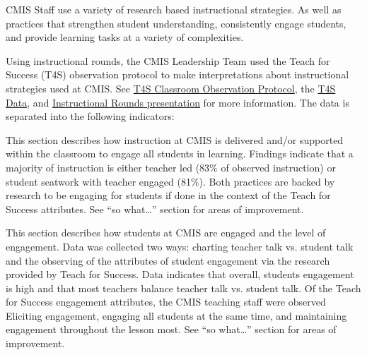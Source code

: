 \begin{findings}

CMIS Staff use a variety of research based instructional strategies. As well as practices that strengthen student understanding, consistently engage students, and provide learning tasks at a variety of complexities. 

Using instructional rounds, the CMIS Leadership Team used the Teach for Success (T4S) observation protocol to make interpretations about instructional strategies used at CMIS. See \href{https://docs.google.com/a/cmis.ac.th/spreadsheets/d/1ACz3l3DPUgIqRhmZ1LWk9RwVBjo0iLsbJAupJoic5Dg/edit?usp=sharing}{T4S Classroom Observation Protocol}, the \href{https://docs.google.com/a/cmis.ac.th/document/d/1cRvL50iIDvo8s1Gnxoczm82LhSVmEOvCrFksxzHD7ko/edit?usp=sharing}{T4S Data}, and \href{https://docs.google.com/a/cmis.ac.th/presentation/d/1LWASWS2DRPSgW6N4jZdZI4vuHiNOm3UoWzfGe91JdOs/edit?usp=sharing}{Instructional Rounds presentation} for more information. The data is separated into the following indicators:


This section describes how instruction at CMIS is delivered and/or supported within the classroom to engage all students in learning. Findings indicate that a majority of instruction is either teacher led (83\% of observed instruction) or student seatwork with teacher engaged (81\%).  Both practices are backed by research to be engaging for students if done in the context of the Teach for Success attributes.  See “so what…” section for areas of improvement. 


This section describes how students at CMIS are engaged and the level of engagement. Data was collected two ways: charting teacher talk vs. student talk and the observing of the attributes of student engagement via the research provided by Teach for Success. Data indicates that overall, students engagement is high and that most teachers balance teacher talk vs. student talk. Of the Teach for Success engagement attributes, the CMIS teaching staff were observed Eliciting engagement, engaging all students at the same time, and maintaining engagement throughout the lesson most. See “so what…” section for areas of improvement. 



\end{findings}
